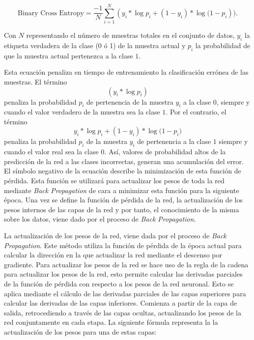 \documentclass{uathesis-es}
\begin{document}
	$$\text{Binary Cross Entropy} = \frac{-1}{N} \sum_{i=1}^{N} (y_{i}*\log{p_{i}}+ (1 - y_{i})*\log{(1-p_{i}})).$$
	
	Con $N$ representando el número de muestras totales en el conjunto de datos, $y_i$ la etiqueta verdadera de la clase (0 ó 1) de la muestra actual y $p_i$ la probabilidad de que la muestra actual pertenezca a la clase $1$.
	
	Esta ecuación penaliza en tiempo de entrenamiento la clasificación errónea de las muestras. El término $$(y_{i}*\log p_{i})$$ penaliza la probabilidad $p_i$ de pertenencia de la muestra $y_i$ a la clase $0$, siempre y cuando el valor verdadero de la muestra sea la clase $1$. Por el contrario, el término 
	$$y_{i}*\log{p_{i}}+ (1 - y_{i})*\log{(1-p_{i}})$$
	penaliza la probabilidad $p_i$ de la muestra $y_i$ de pertenencia a la clase $1$ siempre y cuando el valor real sea la clase $0$. Así, valores de probabilidad altos de la predicción de la red a las clases incorrectas, generan una acumulación del error. El símbolo negativo de la ecuación describe la minimización de esta función de pérdida. Esta función se utilizará para actualizar los pesos de toda la red mediante \textit{Back Propagation} de cara a minimizar esta función para la siguiente época. Una vez se define la función de pérdida de la red, la actualización de los pesos internos de las capas de la red y por tanto, el conocimiento de la misma sobre los datos, viene dado por el proceso de \textit{Back Propagation}.
	
	
	
	
	
	La actualización de los pesos de la red, viene dada por el proceso de \textit{Back Propagation}. Este método utiliza la función de pérdida de la época actual para calcular la dirección en la que actualizar la red mediante el descenso por gradiente. Para actualizar los pesos de la red se hace uso de la regla de la cadena para actualizar los pesos de la red, esto permite calcular las derivadas parciales de la función de pérdida con respecto a los pesos de la red neuronal. Esto se aplica mediante el cálculo de las derivadas parciales de las capas superiores para calcular las derivadas de las capas inferiores. Comienza a partir de la capa de salida, retrocediendo a través de las capas ocultas, actualizando los pesos de la red conjuntamente en cada etapa. La siguiente fórmula representa la la actualización de los pesos para una de estas capas:
	
\end{document}
